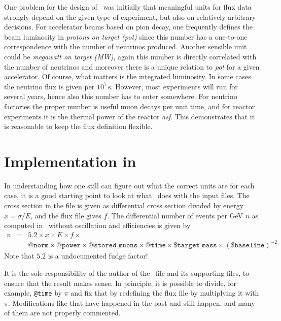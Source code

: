 \begin{appendix}
One problem for the design of \AEDL\ was initially that meaningful
units for flux data strongly depend on the given type of experiment,
but also on relatively arbitrary decisions. For accelerator beams
based on pion decay, one frequently defines the beam luminosity in
{\it protons on target (pot)} since this number has a one-to-one
correspondence with the number of neutrinos produced. Another sensible
unit could be {\it megawatt on target (MW)}, again this number is directly
correlated with the number of neutrinos and moreover there is a unique
relation to {\it pot} for a given accelerator. Of course,
what matters is the integrated luminosity. In some  cases the
neutrino flux is given per $10^7\,\mathrm{s}$. However,
most experiments will run for several years, hence also this number
has to enter somewhere. For neutrino factories the proper number is
useful muon decays per unit time, and for reactor experiments it is
the thermal power of the reactor {\it asf}. This demonstrates that it is
reasonable to keep the flux definition flexible.

\section*{Implementation in \GLOBES }

In understanding how one still can figure out what the correct units
are for each case, it is a good starting point to look at what
\GLOBES\ does with the input files. The cross section in the file is given as
differential cross section divided by energy $x=\sigma/E$, and the flux file
gives $f$. The differential number of events per GeV $n$ as computed in
\GLOBES\ without oscillation and efficiencies is given by
\begin{eqnarray}
n &=& 5.2\times x\times E\times f\times \nonumber \\
&&\mathtt{@norm}\times\mathtt{@power}\times\mathtt{@stored\_muons}\times\mathtt{@time}\times\mathtt{\$target\_mass}\times(\mathtt{\$baseline})^{-2} \nonumber
\end{eqnarray}
Note that $5.2$ is a undocumented fudge factor!

It is the sole responsibility of the author of the \AEDL\ file and its
supporting files, to ensure that the result makes sense. In
principle, it is possible to divide, for example, {\tt @time}  by
$\pi$ and fix that by redefining the flux file by multiplying
it with $\pi$. Modifications like that have happened in the past
and still happen, and many of them are not properly commented.
 

\end{appendix}
